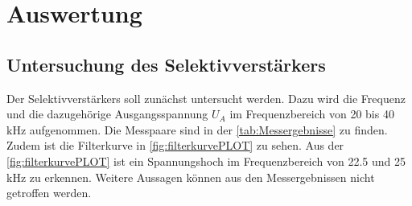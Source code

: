 \section{Auswertung}
\label{sec:Auswertung}
\subsection{Untersuchung des Selektivverstärkers}
\label{subsec:Selektivverstäarker}
Der Selektivverstärkers soll zunächst untersucht werden.
Dazu wird die Frequenz und die dazugehörige Ausgangsspannung $U_A$ im Frequenzbereich von 20 bis 40 $\si{\kilo\hertz}$ aufgenommen.
Die Messpaare sind in der \autoref{tab:Messergebnisse} zu finden.
Zudem ist die Filterkurve in \autoref{fig:filterkurvePLOT} zu sehen.
Aus der \autoref{fig:filterkurvePLOT} ist ein Spannungshoch im Frequenzbereich von 22.5 und 25 $\si{\kilo\hertz}$ zu erkennen.
Weitere Aussagen können aus den Messergebnissen nicht getroffen werden.

